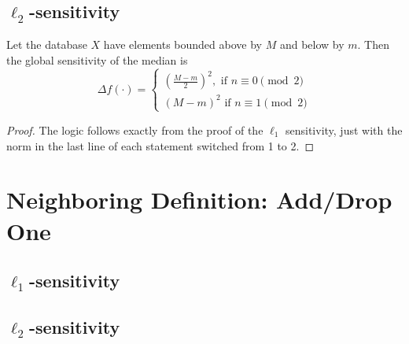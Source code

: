 \documentclass[11pt]{scrartcl} %
\begin{document}
\subsection{$\ell_2$-sensitivity}
\begin{theorem}
	Let the database $X$ have elements bounded above by $M$ and below by $m$.
	Then the global sensitivity of the median is
	\[
		\Delta f(\cdot) =
			\begin{cases}
				\left( \frac{M - m}{2} \right)^2, \text{ if } n \equiv 0 \pmod{2} \\
				(M-m)^2 \text{ if } n \equiv 1 \pmod{2}
			\end{cases}
	\]
\end{theorem}

\begin{proof}
	The logic follows exactly from the proof of the $\ell_1$ sensitivity,
	just with the norm in the last line of each statement switched from 1 to 2.
\end{proof}

\section{Neighboring Definition: Add/Drop One}

\subsection{$\ell_1$-sensitivity}

\subsection{$\ell_2$-sensitivity}
\end{document}
